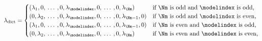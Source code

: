 \begin{equation}
\lambda_{\text{dict}} = 
  \begin{cases}
   (\lambda_{1}, 0, \:\ldots\:, 0, \lambda_{\modelindex}, 0, \:\ldots\:, 0, \lambda_{\Nm}) & \text{if $\Nm$ is odd and $\modelindex$ is odd,} \\
   (0, \lambda_{2},  \:\ldots\:, 0, \lambda_{\modelindex}, 0, \:\ldots\:, 0, \lambda_{\Nm - 1}, 0) & \text{if $\Nm$ is odd and $\modelindex$ is even,} \\
   (\lambda_{1}, 0, \:\ldots\:, 0, \lambda_{\modelindex}, 0, \:\ldots\:, 0, \lambda_{\Nm - 1}, 0) & \text{if $\Nm$ is even and $\modelindex$ is odd,} \\
   (0, \lambda_{2}, \:\ldots\:, 0, \lambda_{\modelindex}, 0, \:\ldots\:, 0, \lambda_{\Nm}) & \text{if $\Nm$ is even and $\modelindex$ is even,}
  \end{cases}
  \label{eqn:dictatorial-def-all}
\end{equation}